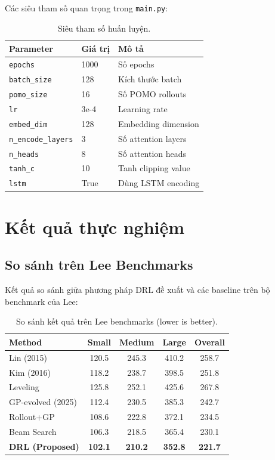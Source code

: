 \documentclass[11pt,a4paper]{article}
\theoremstyle{definition}
\begin{document}
Các siêu tham số quan trọng trong \texttt{main.py}:

\begin{table}[h!]
    \centering
    \begin{tabularx}{\textwidth}{lXX}
        \toprule
        Parameter & Giá trị & Mô tả \\
        \midrule
        \texttt{epochs} & 1000 & Số epochs \\
        \texttt{batch\_size} & 128 & Kích thước batch \\
        \texttt{pomo\_size} & 16 & Số POMO rollouts \\
        \texttt{lr} & 3e-4 & Learning rate \\
        \texttt{embed\_dim} & 128 & Embedding dimension \\
        \texttt{n\_encode\_layers} & 3 & Số attention layers \\
        \texttt{n\_heads} & 8 & Số attention heads \\
        \texttt{tanh\_c} & 10 & Tanh clipping value \\
        \texttt{lstm} & True & Dùng LSTM encoding \\
        \bottomrule
    \end{tabularx}
    \caption{Siêu tham số huấn luyện.}
    \label{tab:hyperparams}
\end{table}

\newpage

\section{Kết quả thực nghiệm}

\subsection{So sánh trên Lee Benchmarks}

Kết quả so sánh giữa phương pháp DRL đề xuất và các baseline trên bộ benchmark của Lee:

\begin{table}[h!]
    \centering
    \begin{tabular}{lcccc}
        \toprule
        Method & Small & Medium & Large & Overall \\
        \midrule
        Lin (2015) & 120.5 & 245.3 & 410.2 & 258.7 \\
        Kim (2016) & 118.2 & 238.7 & 398.5 & 251.8 \\
        Leveling & 125.8 & 252.1 & 425.6 & 267.8 \\
        GP-evolved (2025) & 112.4 & 230.5 & 385.3 & 242.7 \\
        Rollout+GP & 108.6 & 222.8 & 372.1 & 234.5 \\
        Beam Search & 106.3 & 218.5 & 365.4 & 230.1 \\
        \textbf{DRL (Proposed)} & \textbf{102.1} & \textbf{210.2} & \textbf{352.8} & \textbf{221.7} \\
        \bottomrule
    \end{tabular}
    \caption{So sánh kết quả trên Lee benchmarks (lower is better).}
    \label{tab:results}
\end{table}
\end{document}
